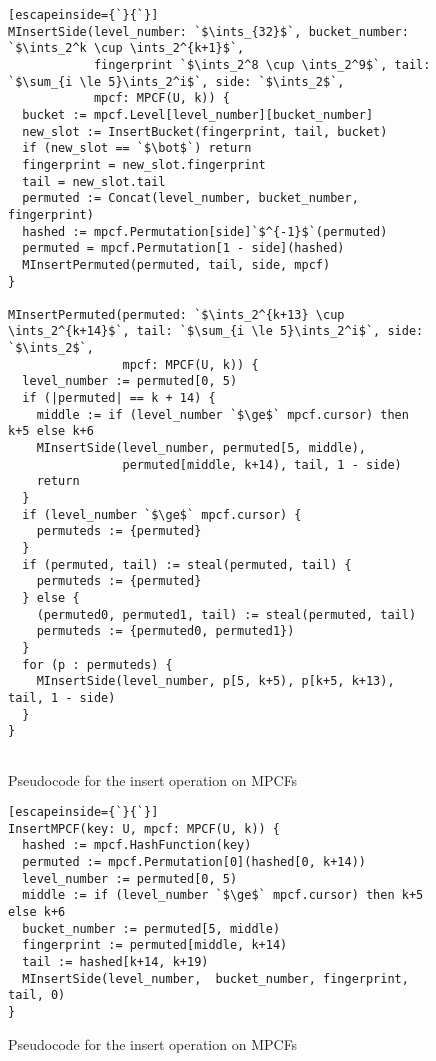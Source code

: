 \documentclass[letterpaper, 11pt]{article}
\newcommand{\ints}{\mathbb{Z}}
\begin{document}
\begin{figure}
\begin{lstlisting}[escapeinside={`}{`}]
MInsertSide(level_number: `$\ints_{32}$`, bucket_number: `$\ints_2^k \cup \ints_2^{k+1}$`,
            fingerprint `$\ints_2^8 \cup \ints_2^9$`, tail: `$\sum_{i \le 5}\ints_2^i$`, side: `$\ints_2$`,
            mpcf: MPCF(U, k)) {
  bucket := mpcf.Level[level_number][bucket_number]
  new_slot := InsertBucket(fingerprint, tail, bucket)
  if (new_slot == `$\bot$`) return
  fingerprint = new_slot.fingerprint
  tail = new_slot.tail
  permuted := Concat(level_number, bucket_number, fingerprint)
  hashed := mpcf.Permutation[side]`$^{-1}$`(permuted)
  permuted = mpcf.Permutation[1 - side](hashed)
  MInsertPermuted(permuted, tail, side, mpcf)
}

MInsertPermuted(permuted: `$\ints_2^{k+13} \cup \ints_2^{k+14}$`, tail: `$\sum_{i \le 5}\ints_2^i$`, side: `$\ints_2$`,
                mpcf: MPCF(U, k)) {
  level_number := permuted[0, 5)
  if (|permuted| == k + 14) {
    middle := if (level_number `$\ge$` mpcf.cursor) then k+5 else k+6
    MInsertSide(level_number, permuted[5, middle),
                permuted[middle, k+14), tail, 1 - side)
    return
  }
  if (level_number `$\ge$` mpcf.cursor) {
    permuteds := {permuted}
  }
  if (permuted, tail) := steal(permuted, tail) {
    permuteds := {permuted}
  } else {
    (permuted0, permuted1, tail) := steal(permuted, tail)
    permuteds := {permuted0, permuted1})
  }
  for (p : permuteds) {
    MInsertSide(level_number, p[5, k+5), p[k+5, k+13), tail, 1 - side)
  }
}


\end{lstlisting}
\caption{Pseudocode for the insert operation on MPCFs}
\end{figure}


\begin{figure}
\begin{lstlisting}[escapeinside={`}{`}]
InsertMPCF(key: U, mpcf: MPCF(U, k)) {
  hashed := mpcf.HashFunction(key)
  permuted := mpcf.Permutation[0](hashed[0, k+14))
  level_number := permuted[0, 5)
  middle := if (level_number `$\ge$` mpcf.cursor) then k+5 else k+6
  bucket_number := permuted[5, middle)
  fingerprint := permuted[middle, k+14)
  tail := hashed[k+14, k+19)
  MInsertSide(level_number,  bucket_number, fingerprint, tail, 0)
}
\end{lstlisting}
\caption{Pseudocode for the insert operation on MPCFs}
\end{figure}
\end{document}
